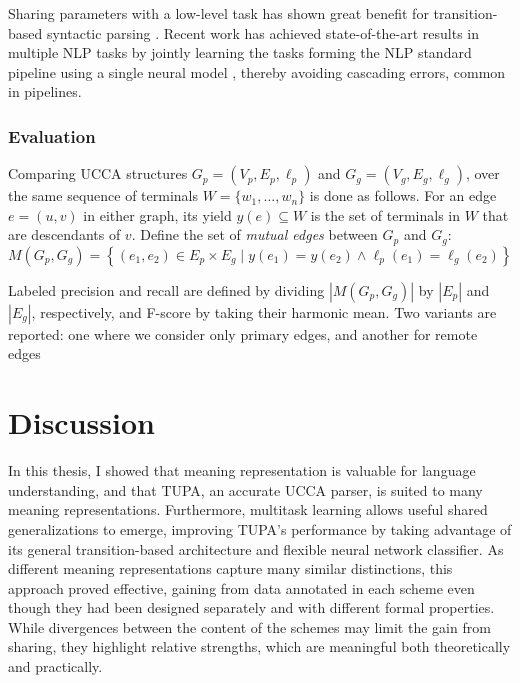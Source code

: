 \documentclass[12pt,a4paper,table]{report}
\begin{document}
Sharing parameters with a low-level task
has shown great benefit for transition-based syntactic parsing
\citep{bohnet2012transition,Zhang2016StackpropagationIR,constant-nivre:2016:P16-1,more2016joint}.
Recent work has achieved state-of-the-art results in multiple NLP tasks
by jointly learning the tasks forming the NLP standard pipeline using 
a single neural model \citep{collobert2011natural,D17-1206},
thereby avoiding cascading errors, common in pipelines.


\subsection*{Evaluation}
Comparing UCCA structures
$G_p=(V_p,E_p,\ell_p)$ and $G_g=(V_g,E_g,\ell_g)$,
over the same sequence of terminals $W = \{w_1,\ldots,w_n\}$
is done as follows.
For an edge $e=(u,v)$ in either graph, its yield $y(e) \subseteq W$ is the
set of terminals in $W$ that are descendants of $v$.
Define the set of \textit{mutual edges} between $G_p$ and $G_g$:
\[
    M(G_p,G_g) =
    \left\{(e_1,e_2) \in E_p \times E_g \;|\;
    y(e_1) = y(e_2) \wedge \ell_p(e_1)=\ell_g(e_2)\right\}
\]

Labeled precision and recall are defined by dividing $|M(G_p,G_g)|$ by $|E_p|$ and $|E_g|$, respectively,
and F-score by taking their harmonic mean.
Two variants are reported: one where we consider only primary edges,
and another for remote edges









\chapter{Discussion}

In this thesis, I showed that meaning representation is valuable for language understanding,
and that TUPA, an accurate UCCA parser, is suited to many meaning representations.
Furthermore, multitask learning allows useful shared generalizations to emerge,
improving TUPA's performance by taking advantage of its general transition-based
architecture and flexible neural network classifier.
As different meaning representations capture many similar distinctions,
this approach proved effective, gaining from data annotated in each scheme
even though they had been designed separately and with different formal properties.
While divergences between the content of the schemes may limit the gain from sharing,
they highlight relative strengths, which are meaningful both theoretically and practically.
\end{document}

